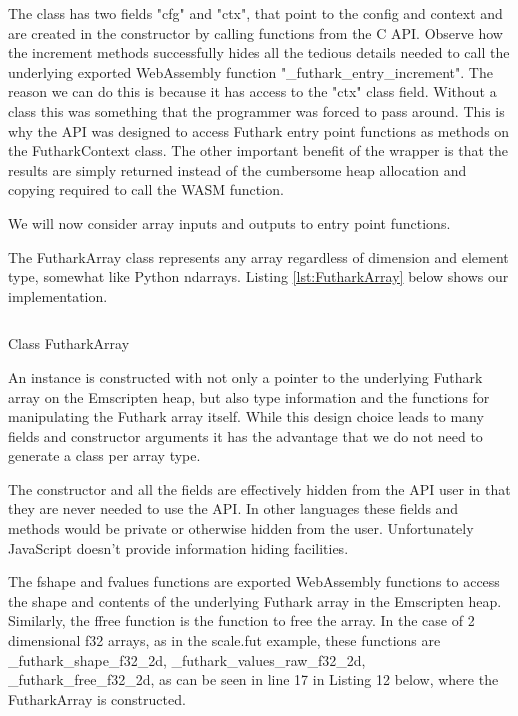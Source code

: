 \documentclass[11pt]{book}
\begin{document}
The class has two fields "cfg" and "ctx", that point to the config and context and are created in the constructor by calling functions from the C API. Observe how the increment methods successfully hides all the tedious details needed to call the underlying exported WebAssembly function "\_futhark\_entry\_increment". The reason we can do this is because it has access to the "ctx" class field. Without a class this was something that the programmer was forced to pass around. This is why the API was designed to access Futhark entry point functions as methods on the FutharkContext class. The other important benefit of the wrapper is that the results are simply returned instead of the cumbersome heap allocation and copying required to call the WASM function.


We will now consider array inputs and outputs to entry point functions. 

The FutharkArray class represents any array regardless of dimension and element type, somewhat like Python ndarrays. Listing \ref{lst:FutharkArray} below shows our implementation.


\begin{listing}[H] 
        \inputminted[fontsize=\small,baselinestretch=0.5,linenos]{JavaScript}{code/compiler/api_examples/FutharkArray.js}
        \caption{Class FutharkArray}
        \label{lst:FutharkArray}    
\end{listing} 

An instance is constructed with not only a pointer to the underlying Futhark array on the Emscripten heap, but also type information and the functions for manipulating the Futhark array itself. 
While this design choice leads to many fields and constructor arguments it has the advantage that we do not need to generate a class per array type.

The constructor and all the fields are effectively hidden from the API user in that they are never needed to use the API. In other languages these fields and methods would be private or otherwise hidden from the user. Unfortunately JavaScript doesn't provide information hiding facilities.

The fshape and fvalues functions are exported WebAssembly functions to access the shape and contents of the underlying Futhark array in the Emscripten heap. Similarly, the ffree function is the function to free the array. In the case of 2 dimensional f32 arrays, as in the scale.fut example, these functions are \_futhark\_shape\_f32\_2d, \_futhark\_values\_raw\_f32\_2d, \_futhark\_free\_f32\_2d, as can be seen in line 17 in Listing 12 below, where the FutharkArray is constructed.
\end{document}
